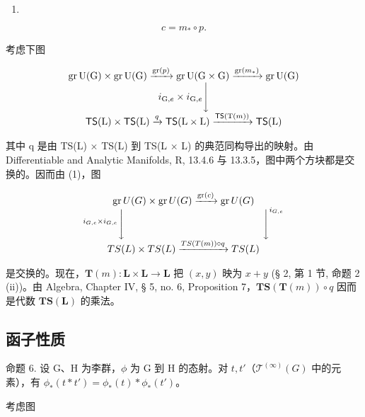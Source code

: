 \begin{enumerate}
\def\labelenumi{(\arabic{enumi})}
\tightlist
\item
\end{enumerate}

\[
c = m _ {*} \circ p.
\]

考虑下图

\[
\begin{array}{c} \operatorname{gr} \mathrm{U(G)} \times \operatorname{gr} \mathrm{U(G)} \xrightarrow {\operatorname{gr} (p)} \operatorname{gr} \mathrm{U(G \times G)} \xrightarrow {\operatorname{gr} (m _ {*})} \operatorname{gr} \mathrm{U(G)} \\ i _ {\mathrm{G}, e} \times i _ {\mathrm{G}, e} \Biggl \downarrow \\ \mathsf {T S} (\mathrm{L}) \times \mathsf {T S} (\mathrm{L}) \xrightarrow {q} \mathsf {T S} (\mathrm{L} \times \mathrm{L}) \xrightarrow {\mathsf {T S} (\mathrm{T} (m))} \mathsf {T S} (\mathrm{L}) \end{array}
\]

其中 q 是由 TS(L) × TS(L) 到 TS(L × L) 的典范同构导出的映射。由 Differentiable and Analytic Manifolds, R, 13.4.6 与 13.3.5，图中两个方块都是交换的。因而由 (1)，图

\[
\begin{array}{c} \operatorname{gr} U (G) \times \operatorname{gr} U (G) \xrightarrow {\operatorname{gr} (c)} \operatorname{gr} U (G) \\ ^ {i _ {G, e} \times i _ {G, e}} \Biggl \downarrow \qquad \qquad \qquad \qquad \qquad \qquad \qquad \Biggl \downarrow^ {i _ {G, e}} \\ T S (L) \times T S (L) \xrightarrow {T S (T (m)) \circ q} T S (L) \end{array}
\]

是交换的。现在，\(\mathbf{T}(m): \mathbf{L} \times \mathbf{L} \to \mathbf{L}\) 把 \((x, y)\) 映为 \(x + y\) (§ 2, 第 1 节, 命题 2 (ii))。由 Algebra, Chapter IV, § 5, no. 6, Proposition 7，\(\mathbf{TS}(\mathbf{T}(m)) \circ q\) 因而是代数 \(\mathbf{TS}(\mathbf{L})\) 的乘法。

\subsection{函子性质}

命题 6. 设 G、H 为李群，\(\phi\) 为 G 到 H 的态射。对 \(t, t'\)（\(\mathcal{T}^{(\infty)}(G)\) 中的元素），有 \(\phi_{*}(t * t') = \phi_{*}(t) * \phi_{*}(t')\)。

考虑图

